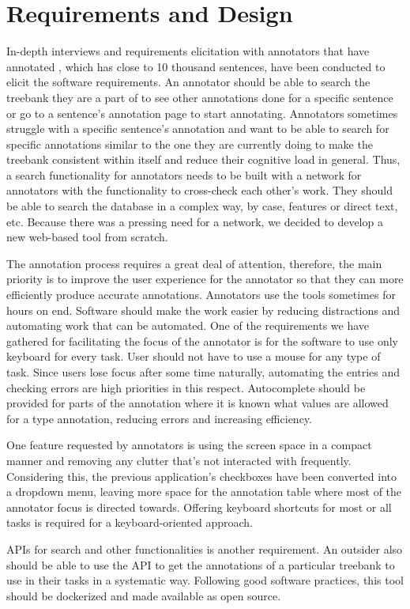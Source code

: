 \section{Requirements and Design}
\label{sec:requirements}

In-depth interviews and requirements elicitation with annotators that have annotated \bountreebank{}, which has close to 10 thousand sentences, have been conducted to elicit the software requirements.
An annotator should be able to search the treebank they are a part of to see other annotations done for a specific sentence or go to a sentence's annotation page to start annotating.
Annotators sometimes struggle with a specific sentence's annotation and want to be able to search for specific annotations similar to the one they are currently doing to make the treebank consistent within itself and reduce their cognitive load in general.
Thus, a search functionality for annotators needs to be built with a network for annotators with the functionality to cross-check each other's work.
They should be able to search the database in a complex way, by case, features or direct text, etc.
Because there was a pressing need for a network, we decided to develop a new web-based tool from scratch.

The annotation process requires a great deal of attention, therefore, the main priority is to improve the user experience for the annotator so that they can more efficiently produce accurate annotations.
Annotators use the tools sometimes for hours on end.
Software should make the work easier by reducing distractions and automating work that can be automated.
One of the requirements we have gathered for facilitating the focus of the annotator is for the software to use only keyboard for every task.
User should not have to use a mouse for any type of task.
Since users lose focus after some time naturally, automating the entries and checking errors are high priorities in this respect.
Autocomplete should be provided for parts of the annotation where it is known what values are allowed for a \conllu{} type annotation, reducing errors and increasing efficiency.

One feature requested by annotators is using the screen space in a compact manner and removing any clutter that's not interacted with frequently.
Considering this, the previous application's checkboxes have been converted into a dropdown menu, leaving more space for the annotation table where most of the annotator focus is directed towards.
Offering keyboard shortcuts for most or all tasks is required for a keyboard-oriented approach.

APIs for search and other functionalities is another requirement.
An outsider also should be able to use the API to get the annotations of a particular treebank to use in their tasks in a systematic way.
Following good software practices, this tool should be dockerized and made available as open source.
